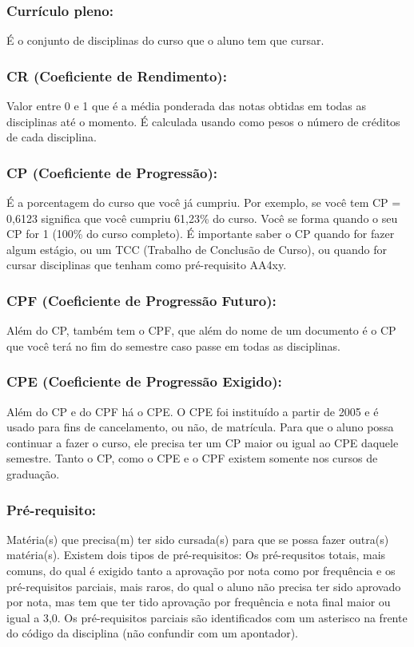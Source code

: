\subsubsection{Currículo pleno:} É o conjunto de disciplinas do curso que o
aluno tem que cursar.

\subsubsection{CR (Coeficiente de Rendimento):} Valor entre 0 e 1 que é a média
ponderada das notas obtidas em todas as disciplinas até o momento.  É calculada
usando como pesos o número de créditos de cada disciplina.

\subsubsection{CP (Coeficiente de Progressão):} É a porcentagem do curso que
você já cumpriu. Por exemplo, se você tem CP = 0,6123 significa que você cumpriu
61,23\% do curso. Você se forma quando o seu CP for 1 (100\% do curso
completo). É importante saber o CP quando for fazer algum estágio, ou um TCC
(Trabalho de Conclusão de Curso), ou quando for cursar disciplinas que tenham
como pré-requisito AA4xy.

\subsubsection{CPF (Coeficiente de Progressão Futuro):} Além do CP, também tem o
CPF, que além do nome de um documento é o CP que você terá no fim do semestre
caso passe em todas as disciplinas.

\subsubsection{CPE (Coeficiente de Progressão Exigido):} Além do CP e do CPF há
o CPE. O CPE foi instituído a partir de 2005 e é usado para fins de
cancelamento, ou não, de matrícula. Para que o aluno possa continuar a fazer o
curso, ele precisa ter um CP maior ou igual ao CPE daquele semestre. Tanto o CP,
como o CPE e o CPF existem somente nos cursos de graduação.

\subsubsection{Pré-requisito:} Matéria(s) que precisa(m) ter sido cursada(s)
para que se possa fazer outra(s) matéria(s). Existem dois tipos de
pré-requisitos: Os pré-requsitos totais, mais comuns, do qual é exigido tanto a
aprovação por nota como por frequência e os pré-requisitos parciais, mais raros,
do qual o aluno não precisa ter sido aprovado por nota, mas tem que ter tido
aprovação por frequência e nota final maior ou igual a 3,0. Os pré-requisitos
parciais são identificados com um asterisco na frente do código da disciplina
(não confundir com um apontador).

